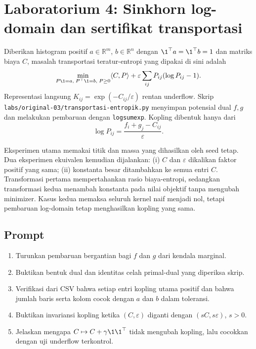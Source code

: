 
\section{Laboratorium 4: Sinkhorn log-domain dan sertifikat transportasi}
\label{orig03:lab:transportasi-entropik}

Diberikan histogram positif $a\in\mathbb{R}^m$, $b\in\mathbb{R}^n$ dengan
$\1^\top a=\1^\top b=1$ dan matriks biaya $C$, masalah
transportasi teratur-entropi yang dipakai di sini adalah
\begin{equation}
 \min_{P\1=a,\;P^\top\1=b,\;P\geq0}
 \langle C,P\rangle+\varepsilon\sum_{ij}P_{ij}(\log P_{ij}-1).
 \label{orig03:eq:sinkhorn-primal}
\end{equation}
Representasi langsung $K_{ij}=\exp(-C_{ij}/\varepsilon)$ rentan underflow.
Skrip \texttt{labs/original-03/transportasi-entropik.py} menyimpan potensial
dual $f,g$ dan melakukan pembaruan dengan \texttt{logsumexp}. Kopling dibentuk
hanya dari
\[
 \log P_{ij}=\frac{f_i+g_j-C_{ij}}{\varepsilon}.
\]

Eksperimen utama memakai titik dan massa yang dihasilkan oleh seed tetap.
Dua eksperimen ekuivalen kemudian dijalankan: (i) $C$ dan $\varepsilon$
dikalikan faktor positif yang sama; (ii) konstanta besar ditambahkan ke semua
entri $C$. Transformasi pertama mempertahankan rasio biaya-entropi, sedangkan
transformasi kedua menambah konstanta pada nilai objektif tanpa mengubah
minimizer. Kasus kedua memaksa seluruh kernel naif menjadi nol, tetapi
pembaruan log-domain tetap menghasilkan kopling yang sama.

\subsection*{Prompt}
\begin{exercise}
\begin{enumerate}
  \item Turunkan pembaruan bergantian bagi $f$ dan $g$ dari kendala marginal.
  \item Buktikan bentuk dual dan identitas celah primal-dual yang diperiksa
    skrip.
  \item Verifikasi dari CSV bahwa setiap entri kopling utama positif dan
    bahwa jumlah baris serta kolom cocok dengan $a$ dan $b$ dalam toleransi.
  \item Buktikan invariansi kopling ketika $(C,\varepsilon)$ diganti dengan
    $(sC,s\varepsilon)$, $s>0$.
  \item Jelaskan mengapa $C\mapsto C+\gamma\1\1^\top$ tidak
    mengubah kopling, lalu cocokkan dengan uji underflow terkontrol.
\end{enumerate}
\end{exercise}

